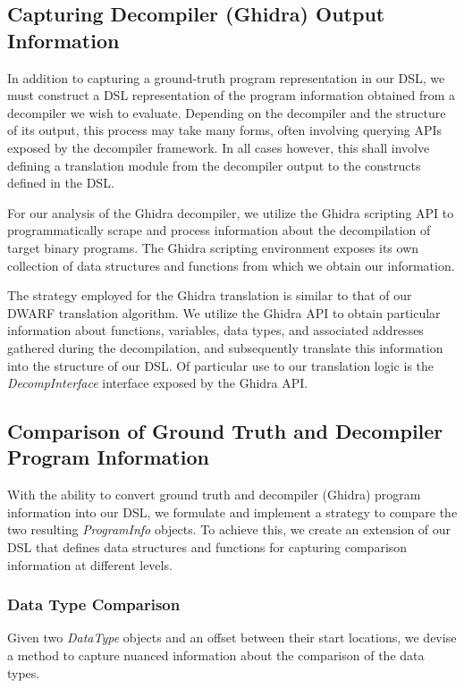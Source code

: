 \documentclass[a4paper,twoside]{article}
\begin{document}
\subsection{Capturing Decompiler (Ghidra) Output Information}

In addition to capturing a ground-truth program representation in our DSL, we must construct a DSL representation of the program information obtained from a decompiler we wish to evaluate. Depending on the decompiler and the structure of its output, this process may take many forms, often involving querying APIs exposed by the decompiler framework. In all cases however, this shall involve defining a translation module from the decompiler output to the constructs defined in the DSL.

For our analysis of the Ghidra decompiler, we utilize the Ghidra scripting API to programmatically scrape and process information about the decompilation of target binary programs. The Ghidra scripting environment exposes its own collection of data structures and functions from which we obtain our information.

The strategy employed for the Ghidra translation is similar to that of our DWARF translation algorithm. We utilize the Ghidra API to obtain particular information about functions, variables, data types, and associated addresses gathered during the decompilation, and subsequently translate this information into the structure of our DSL. Of particular use to our translation logic is the \emph{DecompInterface} interface exposed by the Ghidra API.

\subsection{Comparison of Ground Truth and Decompiler Program Information}

With the ability to convert ground truth and decompiler (Ghidra) program information into our DSL, we formulate and implement a strategy to compare the two resulting \emph{ProgramInfo} objects. To achieve this, we create an extension of our DSL that defines data structures and functions for capturing comparison information at different levels.

\subsubsection{Data Type Comparison}

Given two \emph{DataType} objects and an offset between their start locations, we devise a method to capture nuanced information about the comparison of the data types.
\end{document}
